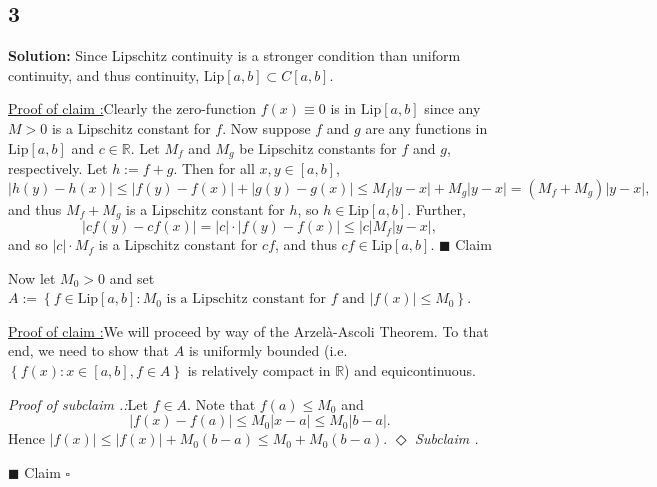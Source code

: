 \documentclass[12pt]{article}
\newcounter{ProofCounter}
\newcounter{ClaimCounter}[ProofCounter]
\newcounter{SubClaimCounter}[ClaimCounter]
\newenvironment{Solution}{\stepcounter{ProofCounter}\textbf{Solution:}}{\hfill$\square$}
\newenvironment{claim}[1]{\vspace{1mm}\stepcounter{ClaimCounter}\par\noindent\underline{\bf Claim \theClaimCounter:}\space#1}{}
\newenvironment{claimproof}[1]{\par\noindent\underline{Proof of claim \theClaimCounter:}\space#1}{\hfill $\blacksquare$ Claim \theClaimCounter}
\newenvironment{subclaim}[1]{\stepcounter{SubClaimCounter}\par\noindent\emph{Subclaim \theClaimCounter.\theSubClaimCounter:}\space#1}{}
\newenvironment{subclaimproof}[1]{\par\noindent\emph{Proof of subclaim \theClaimCounter.\theSubClaimCounter:}\space#1}{\hfill
$\Diamond$ \emph{Subclaim \theClaimCounter.\theSubClaimCounter}}
\begin{document}
\subsection*{3}
\begin{Solution}
  Since Lipschitz continuity is a stronger condition than uniform continuity, and thus continuity, $\text{Lip}[a,b] \subset C[a,b]$. 

  \begin{claimproof}
    Clearly the zero-function $f(x) \equiv 0$ is in $\text{Lip}[a,b]$ since any $M > 0$ is a Lipschitz constant for $f$. Now suppose $f$ and $g$
    are any functions in $\text{Lip}[a,b]$ and $c \in \mathbb{R}$. Let $M_f$ and $M_g$ be Lipschitz constants for $f$ and $g$, respectively. Let $h := f +
    g$. Then for all
    $x, y \in [a,b]$,
    \[
      |h(y) - h(x)| \leq |f(y) - f(x)| + |g(y) - g(x)| \leq M_f |y - x| + M_g |y - x| = (M_f + M_g) |y - x|,
    \]
    and thus $M_f + M_g$ is a Lipschitz constant for $h$, so $h \in \text{Lip}[a,b]$. Further,
    \[
      |cf(y) - cf(x)| = |c| \cdot |f(y) - f(x)| \leq |c| M_f |y - x|,
    \]
    and so $|c|\cdot M_f$ is a Lipschitz constant for $cf$, and thus $cf \in \text{Lip}[a,b]$.
  \end{claimproof}

  Now let $M_0 > 0$ and set $A := \left\{ f \in \text{Lip}[a,b] : M_0\text{ is a Lipschitz constant for $f$ and }|f(x)| \leq M_0 \right\}$.

  \begin{claimproof}
    We will proceed by way of the Arzel{\`a}-Ascoli Theorem. To that end, we need to show that $A$ is uniformly bounded 
    (i.e. $\left\{ f(x) : x \in [a,b], f \in A \right\}$ is relatively compact in $\mathbb{R}$)
    and equicontinuous. 

    \begin{subclaimproof}
      Let $f \in A$. Note that $f(a) \leq M_0$ and 
      \[
        |f(x) - f(a)| \leq M_0 |x - a| \leq M_0 |b - a|. 
      \]
      Hence $|f(x)| \leq |f(x)| + M_0(b - a) \leq M_0 + M_0(b-a)$.
    \end{subclaimproof}


\end{claimproof}
\end{Solution}
\end{document}
